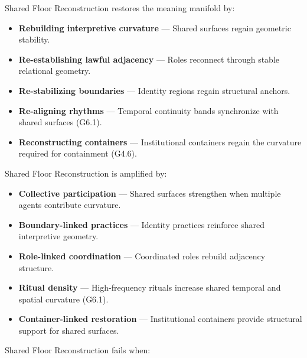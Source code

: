 \noindent Shared Floor Reconstruction restores the meaning manifold by:

\begin{itemize}[leftmargin=1.2cm]
    \item \textbf{Rebuilding interpretive curvature} — Shared surfaces regain
    geometric stability.

    \item \textbf{Re-establishing lawful adjacency} — Roles reconnect through
    stable relational geometry.

    \item \textbf{Re-stabilizing boundaries} — Identity regions regain structural
    anchors.

    \item \textbf{Re-aligning rhythms} — Temporal continuity bands synchronize
    with shared surfaces (G6.1).

    \item \textbf{Reconstructing containers} — Institutional containers regain
    the curvature required for containment (G4.6).
\end{itemize}

\medskip

\noindent Shared Floor Reconstruction is amplified by:

\begin{itemize}[leftmargin=1.2cm]
    \item \textbf{Collective participation} — Shared surfaces strengthen when
    multiple agents contribute curvature.

    \item \textbf{Boundary-linked practices} — Identity practices reinforce
    shared interpretive geometry.

    \item \textbf{Role-linked coordination} — Coordinated roles rebuild adjacency
    structure.

    \item \textbf{Ritual density} — High-frequency rituals increase shared
    temporal and spatial curvature (G6.1).

    \item \textbf{Container-linked restoration} — Institutional containers
    provide structural support for shared surfaces.
\end{itemize}

\medskip

\noindent Shared Floor Reconstruction fails when:

